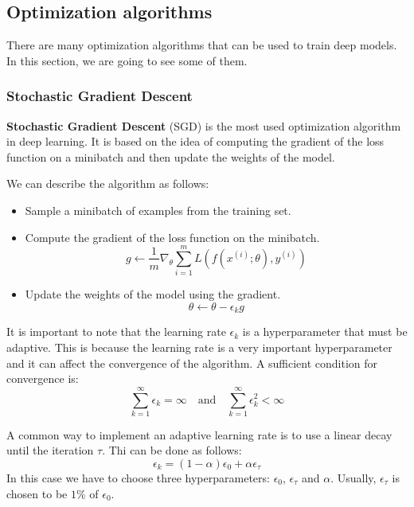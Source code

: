 \subsection{Optimization algorithms}
There are many optimization algorithms that can be used to train deep models.
In this section, we are going to see some of them.
\subsubsection{Stochastic Gradient Descent}
\textbf{Stochastic Gradient Descent} (SGD) is the most used optimization algorithm
in deep learning. It is based on the idea of computing the gradient of the loss
function on a minibatch and then update the weights of the model.

We can describe the algorithm as follows:
\begin{itemize}
    \item Sample a minibatch of examples from the training set.
    \item Compute the gradient of the loss function on the minibatch.
          \begin{equation}
              g \gets \frac{1}{m} \nabla_\theta \sum_{i=1}^m L(f(x^{(i)}; \theta), y^{(i)})
          \end{equation}
    \item Update the weights of the model using the gradient.
          \begin{equation}
              \theta \gets \theta - \epsilon_k g
          \end{equation}
\end{itemize}
It is important to note that the learning rate $\epsilon_k$ is a hyperparameter
that must be adaptive. This is because the learning rate is a very important
hyperparameter and it can affect the convergence of the algorithm. A sufficient
condition for convergence is:
\begin{equation*}
    \sum_{k=1}^\infty \epsilon_k = \infty \quad \text{and} \quad \sum_{k=1}^\infty \epsilon_k^2 < \infty
\end{equation*}

A common way to implement an adaptive learning rate is to use a linear decay
until the iteration $\tau$. Thi can be done as follows:
\begin{equation}
    \epsilon_k = \left(1 - \alpha\right)\epsilon_0 + \alpha \epsilon_\tau
\end{equation}
In this case we have to choose three hyperparameters: $\epsilon_0$, $\epsilon_\tau$
and $\alpha$. Usually, $\epsilon_\tau$ is chosen to be $1\%$ of $\epsilon_0$.

